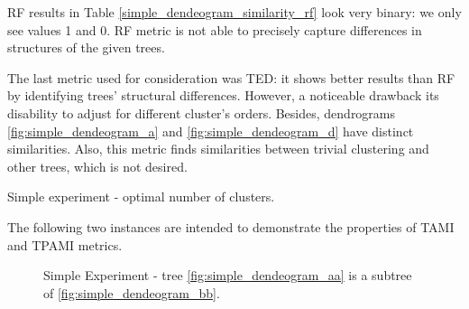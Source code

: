 RF results in Table \ref{simple_dendeogram_similarity_rf} look very binary: we only see values 1 and 0. RF metric is not able to precisely capture differences in structures of the given trees. 

The last metric used for consideration was TED: it shows better results than RF by identifying trees' structural differences. However, a noticeable drawback its disability to adjust for different cluster's orders. Besides, dendrograms \ref{fig:simple_dendeogram_a} and \ref{fig:simple_dendeogram_d} have distinct similarities. Also, this metric finds similarities between trivial clustering and other trees, which is not desired. 

\begin{table}[H]
	\caption{Simple experiment - optimal number of clusters. \label{fig:simple_dendeogram_n_clusters}}
	\centering
	\subfigure[TAMI.]{
		\centering
		 
	}
	\subfigure[TPAMI.]{
		
	}
\end{table}

The following two instances are intended to demonstrate the properties of TAMI and TPAMI metrics.

\begin{figure}[H]
	\centering
	\caption{Simple Experiment - tree \ref{fig:simple_dendeogram_aa} is a subtree of \ref{fig:simple_dendeogram_bb}.}
	\label{fig:simple_trees_comparison_2}
\end{figure}

